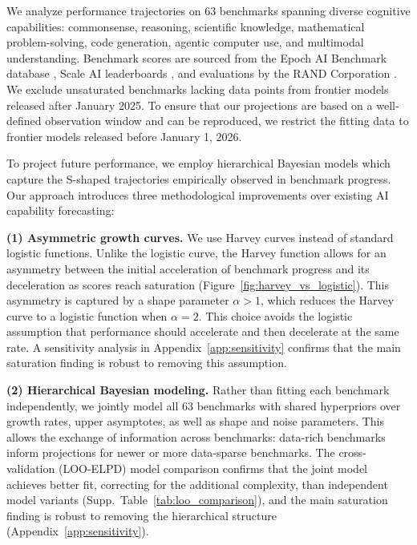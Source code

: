 \documentclass[letterpaper,twocolumn]{article}
\newcommand{\revised}[1]{#1}
\begin{document}
We analyze performance trajectories on \revised{63} benchmarks spanning diverse cognitive capabilities: commonsense, reasoning, scientific knowledge, mathematical problem-solving, code generation, agentic computer use, and multimodal understanding.
Benchmark scores are sourced from the Epoch AI Benchmark database \citep{epoch_ai_ai_2024}, Scale AI leaderboards \citep{scale_ai_introducing_2025}, and evaluations by the RAND Corporation \citep{dev_toward_2025}. We exclude unsaturated benchmarks lacking data points from frontier models released after January 2025. \revised{To ensure that our projections are based on a well-defined observation window and can be reproduced, we restrict the fitting data to frontier models released before January 1, 2026.}

To project future performance, we employ hierarchical Bayesian models which capture the S-shaped trajectories empirically observed in benchmark progress. Our approach introduces three methodological improvements over existing AI capability forecasting:

\textbf{(1) Asymmetric growth curves.} We use Harvey curves \citep{harvey_time_1984} instead of standard logistic functions. Unlike the logistic curve, the Harvey function allows for an asymmetry between the initial acceleration of benchmark progress and its deceleration as scores reach saturation (Figure~\ref{fig:harvey_vs_logistic}). This asymmetry is captured by a shape parameter $\alpha > 1$, which reduces the Harvey curve to a logistic function when $\alpha = 2$. This choice avoids the logistic assumption that performance should accelerate and then decelerate at the same rate. \revised{A sensitivity analysis in Appendix~\ref{app:sensitivity} confirms that the main saturation finding is robust to removing this assumption.}

\textbf{(2) Hierarchical Bayesian modeling.} Rather than fitting each benchmark independently, we jointly model all \revised{63} benchmarks with shared hyperpriors over growth rates, upper asymptotes, as well as shape and noise parameters. This allows the exchange of information across benchmarks: data-rich benchmarks inform projections for newer or more data-sparse benchmarks. \revised{The cross-validation (LOO-ELPD) model comparison confirms that the joint model achieves better fit, correcting for the additional complexity, than independent model variants (Supp.\ Table~\ref{tab:loo_comparison}), and the main saturation finding is robust to removing the hierarchical structure (Appendix~\ref{app:sensitivity}).}
\end{document}

